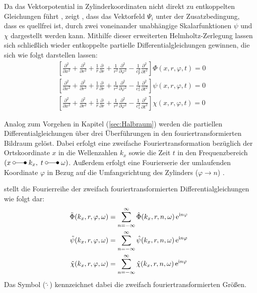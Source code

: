 Da das Vektorpotential in Zylinderkoordinaten nicht direkt zu entkoppelten Gleichungen führt \citep{Hackenberg2016}, zeigt \cite{Fruehe2010}, dass das Vektorfeld $\Psi_{i}$ unter der Zusatzbedingung, dass es quellfrei ist, durch zwei voneinander unabhängige Skalarfunktionen $\psi$ und $\chi$ dargestellt werden kann.
Mithilfe dieser erweiterten Helmholtz-Zerlegung lassen sich schließlich wieder entkoppelte partielle Differentialgleichungen gewinnen, die sich wie folgt darstellen lassen:
\begin{subequations}\label{eq:cyl_wave}
	{
		\begin{align}
			&\left[\frac{\partial^{2}}{\partial x^{2}}
			+ \frac{\partial^{2}}{\partial r^{2}}
			+ \frac{1}{r}\frac{\partial}{\partial r}
			+ \frac{1}{r^{2}}\frac{\partial^{2}}{\partial \varphi^{2}}
			- \frac{1}{c_p^{2}}\frac{\partial^{2}}{\partial t^{2}}\right]
			\Phi(x,r,\varphi,t)=0 \label{eq:cyl_phi}\\[6pt]
			&\left[\frac{\partial^{2}}{\partial x^{2}}
			+ \frac{\partial^{2}}{\partial r^{2}}
			+ \frac{1}{r}\frac{\partial}{\partial r}
			+ \frac{1}{r^{2}}\frac{\partial^{2}}{\partial \varphi^{2}}
			- \frac{1}{c_s^{2}}\frac{\partial^{2}}{\partial t^{2}}\right]
			\psi(x,r,\varphi,t)=0 \label{eq:cyl_psi}\\[6pt]
			&\left[\frac{\partial^{2}}{\partial x^{2}}
			+ \frac{\partial^{2}}{\partial r^{2}}
			+ \frac{1}{r}\frac{\partial}{\partial r}
			+ \frac{1}{r^{2}}\frac{\partial^{2}}{\partial \varphi^{2}}
			- \frac{1}{c_s^{2}}\frac{\partial^{2}}{\partial t^{2}}\right]
			\chi(x,r,\varphi,t)=0 \label{eq:cyl_chi}
		\end{align}
	}%
\end{subequations}


Analog zum Vorgehen in Kapitel (\ref{sec:Halbraum}) werden die partiellen Differentialgleichungen über drei Überführungen in den fouriertransformierten Bildraum gelöst.
Dabei erfolgt eine zweifache Fouriertransformation bezüglich der Ortskoordinate $x$ in die Wellenzahlen $k_{x}$
sowie die Zeit $t$ in den Frequenzbereich \((x \mapto k_x,\; t \mapto \omega)\).
Außerdem erfolgt eine Fourierserie der umlaufenden Koordinate $\varphi$ in Bezug auf die Umfangsrichtung des Zylinders (\(\varphi \rightarrow n\)) \citep{Kausel2006}.

\cite{Hackenberg2016} stellt die Fourierreihe der zweifach fouriertransformierten Differentialgleichungen wie folgt dar:
\begin{subequations}\label{eq:circ_fourier}
	\begin{align}
		\tilde{\Phi}(k_x,r,\varphi,\omega)
		&= \sum_{n=-\infty}^{\infty} \hat{\Phi}(k_x,r,n,\omega)\,\mathrm{e}^{\mathrm{i} n \varphi} \label{eq:circ_fourier_a}\\
		\tilde{\psi}(k_x,r,\varphi,\omega)
		&= \sum_{n=-\infty}^{\infty} \hat{\psi}(k_x,r,n,\omega)\,\mathrm{e}^{\mathrm{i} n \varphi} \label{eq:circ_fourier_b}\\
		\tilde{\chi}(k_x,r,\varphi,\omega)
		&= \sum_{n=-\infty}^{\infty} \hat{\chi}(k_x,r,n,\omega)\,\mathrm{e}^{\mathrm{i} n \varphi} \label{eq:circ_fourier_c}
	\end{align}
\end{subequations}
Das Symbol ($\tilde{\cdot}$) kennzeichnet dabei die zweifach fouriertransformierten Größen.

